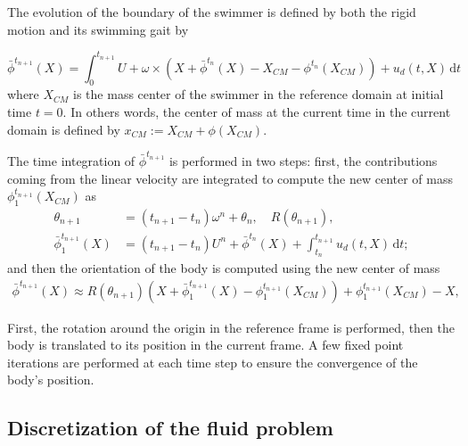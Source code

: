 \documentclass[graybox]{svmult}
\newcommand{\Fluid}{\mathcal{F}} %
\newcommand{\Alemap}{\mathcal{A}} %
\newcommand{\ALE}{ALE} %
\newcommand{\tvel}{U} %
\newcommand{\angvel}{\omega} %
\newcommand{\CompDomain}{\Fluid}
\begin{document}
The evolution of the boundary of the swimmer is defined by both the rigid motion and its swimming gait by 
 
$$
\bar{\phi}^{t_{n+1}}(X) = \int_{0}^{t_{n+1}}\tvel + \angvel\times(X+\bar{\phi}^{t_n}(X)-X_{CM}- \phi^{t_n}(X_{CM})) + u_d(t,X)\, \mathrm{d}t
$$
where $X_{CM}$ is the mass center of the swimmer in the reference domain at initial time $t=0$. In others words, the center of mass at the current time in the current domain is defined by $x_{CM} := X_{CM} + \phi(X_{CM})$.

The time integration of $\bar{\phi}^{t_{n+1}}$  is performed in two steps: first, the contributions coming from the linear velocity are integrated to compute the new center of mass $\phi_1^{t_{n+1}}(X_{CM}) $ as
\begin{equation}
	\begin{aligned}
		\theta_{n+1}&= (t_{n+1}-t_n)\angvel^n + \theta_{n}, \quad R(\theta_{n+1}),\\
		\bar{\phi}_1^{t_{n+1}}(X) &= (t_{n+1}-t_n)\tvel^n + \bar{\phi}^{t_{n}}(X) + \int_{t_n}^{t_{n+1}} u_d(t,X)\, \mathrm{d}t;
	\end{aligned}
	\label{Eq:discDisp1}
\end{equation}
and then the orientation of the body is computed using the new center of mass 
\begin{multline}
	\bar{\phi}^{t_{n+1}}(X) \approx  R(\theta_{n+1}) (X+\bar{\phi}_1^{t_{n+1}}(X)- \phi_1^{t_{n+1}}(X_{CM})) + \phi_1^{t_{n+1}}(X_{CM})-X,
	\label{Eq:discDisp2}
\end{multline}

First, the rotation around the origin in the reference frame is performed, then the body is translated to its position in the current frame. A few fixed point iterations are performed at each time step to ensure the convergence of the body's position.


\subsection{Discretization of the fluid problem}
\end{document}
